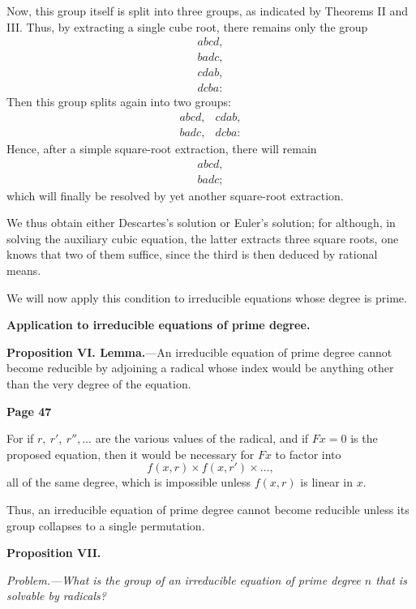 \documentclass{article}
\begin{document}
\medskip

Now, this group itself is split into three groups, as indicated by Theorems II and III. Thus, by extracting a single cube root, there remains only the group
\[
\begin{matrix}
abcd,\\ badc,\\ cdab,\\
dcba:
\end{matrix}
\]
Then this group splits again into two groups:
\[
\begin{matrix}
abcd, & cdab,\\ badc, & dcba:
\end{matrix}
\]
Hence, after a simple square-root extraction, there will remain
\[
\begin{matrix}
abcd,\\ badc;
\end{matrix}
\]
which will finally be resolved by yet another square-root extraction.

We thus obtain either Descartes's solution or Euler's solution; for although, in solving the auxiliary cubic equation, the latter extracts three square roots, one knows that two of them suffice, since the third is then deduced by rational means.

We will now apply this condition to irreducible equations whose degree is prime.

\textbf{Application to irreducible equations of prime degree.}

\textbf{Proposition VI. Lemma.}---An irreducible equation of prime degree cannot become reducible by adjoining a radical whose index would be anything other than the very degree of the equation.

\bigskip


\newpage

\centerline{\textbf{Page 47}}

\medskip

For if $r,\ r',\ r'',\dots$ are the various values of the radical, and if $Fx = 0$ is the proposed equation, then it would be necessary for $Fx$ to factor into
\[
f(x,r)\times f(x,r')\times \dots,
\]
all of the same degree, which is impossible unless $f(x,r)$ is linear in $x$. 

Thus, an irreducible equation of prime degree cannot become reducible unless its group collapses to a single permutation.

\textbf{Proposition VII.}

\emph{Problem.---What is the group of an irreducible equation of prime degree $n$ that is solvable by radicals?}
\end{document}
